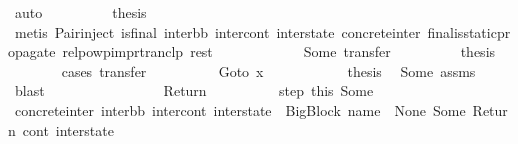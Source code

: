 \begin{isabellebody}
\ auto\isanewline
\isanewline
\ \ \ \ \ \ \isamarkupfalse%
\ \isamarkupfalse%
\ {\isacharquery}{\kern0pt}thesis\ \isanewline
\ \ \ \ \ \ \ \ \isamarkupfalse%
\ {\isacharparenleft}{\kern0pt}metis\ Pair{\isacharunderscore}{\kern0pt}inject\ {\isacartoucheopen}is{\isacharunderscore}{\kern0pt}final\ {\isacharparenleft}{\kern0pt}inter{\isacharunderscore}{\kern0pt}bb{\isacharcomma}{\kern0pt}\ inter{\isacharunderscore}{\kern0pt}cont{\isacharcomma}{\kern0pt}\ inter{\isacharunderscore}{\kern0pt}state{\isacharparenright}{\kern0pt}{\isacartoucheclose}\ concrete{\isacharunderscore}{\kern0pt}inter\ final{\isacharunderscore}{\kern0pt}is{\isacharunderscore}{\kern0pt}static{\isacharunderscore}{\kern0pt}propagate\ relpowp{\isacharunderscore}{\kern0pt}imp{\isacharunderscore}{\kern0pt}rtranclp\ rest{\isacharparenright}{\kern0pt}\isanewline
\ \ \ \ \isamarkupfalse%
\isanewline
\ \ \ \ \ \ \isamarkupfalse%
\ {\isacharparenleft}{\kern0pt}Some\ transfer{\isacharparenright}{\kern0pt}\isanewline
\ \ \ \ \ \ \isamarkupfalse%
\ \isamarkupfalse%
\ {\isacharquery}{\kern0pt}thesis\isanewline
\ \ \ \ \ \ \isamarkupfalse%
\ {\isacharparenleft}{\kern0pt}cases\ transfer{\isacharparenright}{\kern0pt}\isanewline
\ \ \ \ \ \ \ \ \isamarkupfalse%
\ {\isacharparenleft}{\kern0pt}Goto\ x{}{\isacharparenright}{\kern0pt}\isanewline
\ \ \ \ \ \ \ \ \isamarkupfalse%
\ \isamarkupfalse%
\ {\isacharquery}{\kern0pt}thesis\ \isamarkupfalse%
\ Some\ assms{\isacharparenleft}{\kern0pt}{}{\isacharparenright}{\kern0pt}\ \isamarkupfalse%
\ blast\isanewline
\ \ \ \ \ \ \isamarkupfalse%
\isanewline
\ \ \ \ \ \ \ \ \isamarkupfalse%
\ {\isacharparenleft}{\kern0pt}Return{\isacharparenright}{\kern0pt}\isanewline
\ \ \ \ \ \ \ \ \isamarkupfalse%
\ step\ this\ Some\ \isamarkupfalse%
\ concrete{\isacharunderscore}{\kern0pt}inter{\isacharcolon}{\kern0pt}\ {\isachardoublequoteopen}{\isacharparenleft}{\kern0pt}inter{\isacharunderscore}{\kern0pt}bb{\isacharcomma}{\kern0pt}\ inter{\isacharunderscore}{\kern0pt}cont{\isacharcomma}{\kern0pt}\ inter{\isacharunderscore}{\kern0pt}state{\isacharparenright}{\kern0pt}\ {\isacharequal}{\kern0pt}\ {\isacharparenleft}{\kern0pt}BigBlock\ name\ {\isacharbrackleft}{\kern0pt}{\isacharbrackright}{\kern0pt}\ None\ {\isacharparenleft}{\kern0pt}Some\ Return{\isacharparenright}{\kern0pt}{\isacharcomma}{\kern0pt}\ cont{}{\isacharcomma}{\kern0pt}\ inter{\isacharunderscore}{\kern0pt}state{\isacharparenright}{\kern0pt}{\isachardoublequoteclose}\isanewline

\end{isabellebody}
